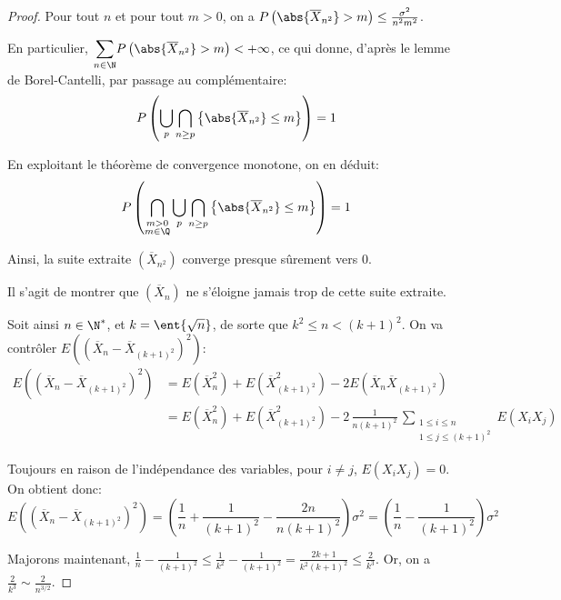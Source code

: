 \begin{proof}
Pour tout $n$ et pour tout $m > 0$, on a $P \left ( \abs{\overline{X}_{n^2}} > m \right ) \leq \frac{\sigma^2}{n^2 m^2}$.

\medskip
En particulier, $\displaystyle{\sum \limits_{n \in \N}} P \left ( \abs{\overline{X}_{n^2}} > m \right ) < +\infty$, ce qui donne, d'après le lemme de Borel-Cantelli, par passage au complémentaire:
\[
P \left ( \bigcup \limits_{p} \bigcap \limits_{n \geq p} \left \{ \abs{\overline{X}_{n^2}} \leq m \right \}  \right ) = 1
\]

En exploitant le théorème de convergence monotone, on en déduit:
\[
P \left ( \bigcap \limits_{\substack{m>0 \\ m \in \Q}} \bigcup \limits_{p} \bigcap \limits_{n \geq p} \left \{ \abs{\overline{X}_{n^2}} \leq m \right \}  \right ) = 1
\]

Ainsi, la suite extraite $\left (\overline{X}_{n^2}\right )$ converge presque sûrement vers $0$.

\medskip
Il s'agit de montrer que $\left (\overline{X}_n\right )$ ne s'éloigne jamais trop de cette suite extraite.


\medskip
Soit ainsi $n \in \N^*$, et $k = \ent{\sqrt{n}}$, de sorte que $k^2 \leq n < (k+1)^2$. On va contrôler $E \left ( \left (\overline{X}_n - \overline{X}_{(k+1)^2}\right )^2\right )$:
\begin{align*}
E \left ( \left (\overline{X}_n - \overline{X}_{(k+1)^2}\right )^2\right ) & = E\left ( \overline{X}_n^2\right ) + E \left (\overline{X}_{(k+1)^2}^2\right ) - 2E \left ( \overline{X}_n \overline{X}_{(k+1)^2} \right ) \\
 & = E\left ( \overline{X}_n^2\right ) + E \left ( \overline{X}_{(k+1)^2}^2\right ) - 2 \, \frac{1}{n(k+1)^2} \, \displaystyle{\sum \limits_{\substack{1 \leq i \leq n\\ 1 \leq j \leq (k+1)^2}}} E\left ( X_iX_j \right )
\end{align*}

Toujours en raison de l'indépendance des variables, pour $i \neq j$, $E\left ( X_iX_j \right ) = 0$. On obtient donc:
\[
E \left ( \left (\overline{X}_n - \overline{X}_{(k+1)^2}\right )^2\right ) = \left ( \frac{1}{n} + \frac{1}{(k+1)^2}- \frac{2n}{n(k+1)^2} \right ) \sigma^2 = \left ( \frac{1}{n} - \frac{1}{(k+1)^2}\right ) \sigma^2 
\]

Majorons maintenant, $\frac{1}{n} - \frac{1}{(k+1)^2} \leq \frac{1}{k^2} - \frac{1}{(k+1)^2} = \frac{2k+1}{k^2(k+1)^2} \leq \frac{2}{k^3}$. Or, on a $\frac{2}{k^3} \sim \frac{2}{n^{3/2}}$. 


\end{proof}

